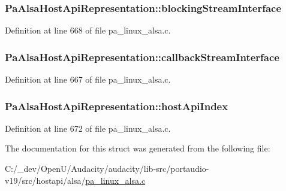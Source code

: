 \subsubsection[{\texorpdfstring{blocking\+Stream\+Interface}{blockingStreamInterface}}]{ Pa\+Alsa\+Host\+Api\+Representation\+::blocking\+Stream\+Interface}\hypertarget{struct_pa_alsa_host_api_representation_ad6a68540d8914bef7af546594c701634}{}\label{struct_pa_alsa_host_api_representation_ad6a68540d8914bef7af546594c701634}


Definition at line 668 of file pa\+\_\+linux\+\_\+alsa.\+c.

\subsubsection[{\texorpdfstring{callback\+Stream\+Interface}{callbackStreamInterface}}]{ Pa\+Alsa\+Host\+Api\+Representation\+::callback\+Stream\+Interface}\hypertarget{struct_pa_alsa_host_api_representation_a7460a29aab991224df3e958f068ad1cd}{}\label{struct_pa_alsa_host_api_representation_a7460a29aab991224df3e958f068ad1cd}


Definition at line 667 of file pa\+\_\+linux\+\_\+alsa.\+c.

\subsubsection[{\texorpdfstring{host\+Api\+Index}{hostApiIndex}}]{ Pa\+Alsa\+Host\+Api\+Representation\+::host\+Api\+Index}\hypertarget{struct_pa_alsa_host_api_representation_af50c4c8ec89a0f6277539588e5bd142d}{}\label{struct_pa_alsa_host_api_representation_af50c4c8ec89a0f6277539588e5bd142d}


Definition at line 672 of file pa\+\_\+linux\+\_\+alsa.\+c.



The documentation for this struct was generated from the following file\+:\begin{DoxyCompactItemize}
\item 
C\+:/\+\_\+dev/\+Open\+U/\+Audacity/audacity/lib-\/src/portaudio-\/v19/src/hostapi/alsa/\hyperlink{pa__linux__alsa_8c}{pa\+\_\+linux\+\_\+alsa.\+c}\end{DoxyCompactItemize}
